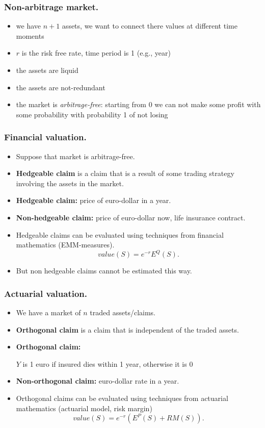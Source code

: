 \documentclass{beamer}
\begin{document}
\begin{frame}[fragile]
\frametitle{Non-arbitrage market.}
\begin{itemize}
  \item we have $n+1$ assets, we want to connect there values at different time moments
	\item $r$ is the risk free rate, time period is 1 (e.g., year)
	\item the assets are liquid
	\item the assets are not-redundant
	\item the market is \textit{arbitrage-free}: starting from 0 we can not make some profit with some probability with probability 1 of not losing
\end{itemize}
\end{frame}
\begin{frame}[fragile]
\frametitle{Financial valuation.}
\begin{itemize}
\item Suppose that market is arbitrage-free.
\item \textbf{Hedgeable claim} is a claim that is a result of some trading strategy involving the assets in the market.
\item \textbf{Hedgeable claim:} price of euro-dollar in a year.
\item \textbf{Non-hedgeable claim:} price of euro-dollar now, life insurance contract.
\item Hedgeable claims can be evaluated using techniques from financial mathematics (EMM-measures).
$$value(S) = e^{-r}E^Q(S).$$
\item But non hedgeable claims cannot be estimated this way.
\end{itemize}
\end{frame}
\begin{frame}[fragile]
\frametitle{Actuarial valuation.}
\begin{itemize}
\item We have a market of $n$ traded assets/claims.
\item \textbf{Orthogonal claim} is a claim that is independent of the traded assets.
\item \textbf{Orthogonal claim:}

$Y$ is 1 euro if insured dies within 1 year, otherwise it is 0
\item \textbf{Non-orthogonal claim:} euro-dollar rate in a year.
\item Orthogonal claims can be evaluated using techniques from actuarial mathematics (actuarial model, risk margin)
$$value(S) = e^{-r}(E^P(S) + RM(S)).$$
\end{itemize}
\end{frame}
\end{document}
